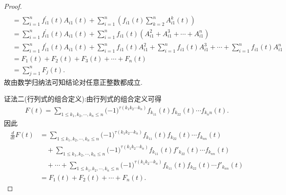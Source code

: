 \documentclass[../../main.tex]{subfiles}
\begin{document}
\begin{proof}
\begin{align*}
\\
&=\sum_{i=1}^n{f_{i1}^{\prime}\left( t \right) A_{i1}\left( t \right)}+\sum_{i=1}^n{\left( f_{i1}\left( t \right) \sum_{k=2}^n{A_{i1}^{k}\left( t \right)} \right)}
\\
&=\sum_{i=1}^n{f_{i1}^{\prime}\left( t \right) A_{i1}\left( t \right)}+\sum_{i=1}^n{f_{i1}\left( t \right) \left( A_{i1}^{2}+A_{i1}^{3}+\cdots +A_{i1}^{n} \right)}
\\
&=\sum_{i=1}^n{f_{i1}^{\prime}\left( t \right) A_{i1}\left( t \right)}+\sum_{i=1}^n{f_{i1}\left( t \right) A_{i1}^{2}}+\sum_{i=1}^n{f_{i1}\left( t \right) A_{i1}^{3}}+\cdots +\sum_{i=1}^n{f_{i1}\left( t \right) A_{i1}^{n}}
\\
&=F_1\left( t \right) +F_2\left( t \right) +F_3\left( t \right) +\cdots +F_n\left( t \right) 
\\
&=\sum_{j=1}^n{F_j\left( t \right)}.
\end{align*}
故由数学归纳法可知结论对任意正整数都成立.

{\color{blue}证法二(行列式的组合定义):}由行列式的组合定义可得
\begin{align*}
F(t)=\sum_{1\le k_1,k_2,\cdots ,k_n\le n}{(}-1)^{\tau (k_1k_2\cdots k_n)}f_{k_11}(t)f_{k_22}(t)\cdots f_{k_nn}(t).
\end{align*}
因此
\begin{align*}
\frac{d}{dt}F(t)&=\sum_{1\le k_1,k_2,\cdots ,k_n\le n}{(}-1)^{\tau (k_1k_2\cdots k_n)}f_{k_{11}}(t)f_{k_{22}}(t)\cdots f_{k_{nn}}(t)
\\
&\quad+\sum_{1\le k_1,k_2,\cdots ,k_n\le n}{(}-1)^{\tau (k_1k_2\cdots k_n)}f_{k_{11}}(t)f\prime_{k_{22}}(t)\cdots f_{k_{nn}}(t)
\\
&\quad+\cdots +\sum_{1\le k_1,k_2,\cdots ,k_n\le n}{(}-1)^{\tau (k_1k_2\cdots k_n)}f_{k_{11}}(t)f_{k_{22}}(t)\cdots f\prime_{k_{nn}}(t)
\\
&=F_1(t)+F_2(t)+\cdots +F_n(t).
\end{align*}
\end{proof}
\end{document}
